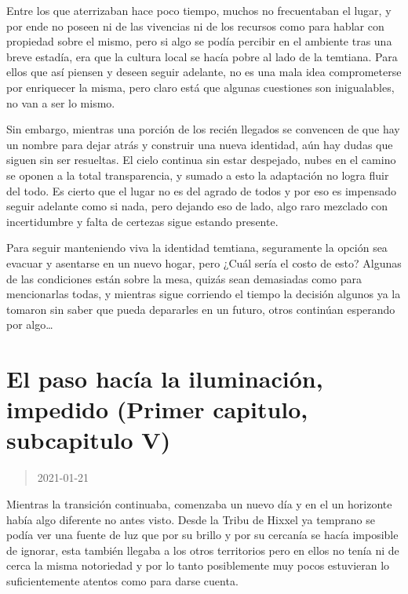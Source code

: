 \documentclass[
  spanish,
]{book}
\begin{document}
Entre los que aterrizaban hace poco tiempo, muchos no frecuentaban el lugar, y por ende no poseen ni de las vivencias ni de los recursos como para hablar con propiedad sobre el mismo, pero si algo se podía percibir en el ambiente tras una breve estadía, era que la cultura local se hacía pobre al lado de la temtiana. Para ellos que así piensen y deseen seguir adelante, no es una mala idea comprometerse por enriquecer la misma, pero claro está que algunas cuestiones son inigualables, no van a ser lo mismo.

Sin embargo, mientras una porción de los recién llegados se convencen de que hay un nombre para dejar atrás y construir una nueva identidad, aún hay dudas que siguen sin ser resueltas. El cielo continua sin estar despejado, nubes en el camino se oponen a la total transparencia, y sumado a esto la adaptación no logra fluir del todo. Es cierto que el lugar no es del agrado de todos y por eso es impensado seguir adelante como si nada, pero dejando eso de lado, algo raro mezclado con incertidumbre y falta de certezas sigue estando presente.

Para seguir manteniendo viva la identidad temtiana, seguramente la opción sea evacuar y asentarse en un nuevo hogar, pero ¿Cuál sería el costo de esto?
Algunas de las condiciones están sobre la mesa, quizás sean demasiadas como para mencionarlas todas, y mientras sigue corriendo el tiempo la decisión algunos ya la tomaron sin saber que pueda depararles en un futuro, otros continúan esperando por algo\ldots{}

\hypertarget{el-paso-hacuxeda-la-iluminaciuxf3n-impedido-primer-capitulo-subcapitulo-v}{%
\section{El paso hacía la iluminación, impedido (Primer capitulo, subcapitulo V)}\label{el-paso-hacuxeda-la-iluminaciuxf3n-impedido-primer-capitulo-subcapitulo-v}}

\begin{quote}
2021-01-21
\end{quote}

Mientras la transición continuaba, comenzaba un nuevo día y en el un horizonte había algo diferente no antes visto. Desde la Tribu de Hixxel ya temprano se podía ver una fuente de luz que por su brillo y por su cercanía se hacía imposible de ignorar, esta también llegaba a los otros territorios pero en ellos no tenía ni de cerca la misma notoriedad y por lo tanto posiblemente muy pocos estuvieran lo suficientemente atentos como para darse cuenta.
\end{document}
